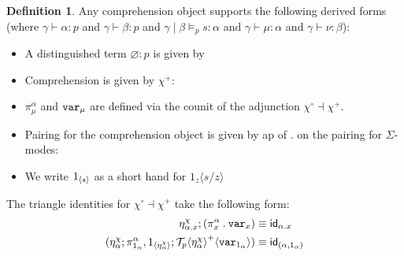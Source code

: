 \documentclass[10pt]{article}
\theoremstyle{definition}
\newtheorem{definition}{Definition}
\let\emptyset\varnothing
\newcommand\dsd[1]{\ensuremath{\mathsf{#1}}}
\newcommand{\yields}{\vdash}
\newcommand{\app}[2]{\ensuremath{#1 \: #2}}
\newcommand{\fst}[1]{\app{\dsd{fst}}{#1}}
\newcommand{\snd}[1]{\app{\dsd{snd}}{#1}}
\newcommand{\id}{\mathsf{id}}
\newcommand\TermTwoT[5]{\ensuremath{#1 \mid #3 \vDash_{#5} {#2} : #4}}
\newcommand\TrPlus[2]{\ensuremath{{#1}^+(#2)}}
\newcommand\El[2]{\mathcal{T}_{#1}(#2)}
\newcommand\ApEl[2]{\mathcal{T}_{#1}\langle#2\rangle}
\newcommand\bdot[0]{\mathbin{.}}
\newcommand\ap[2]{\ensuremath{#1 \langle #2 \rangle }}
\newcommand\ApPlus[2]{\ensuremath{{#1}^+ \langle #2 \rangle }}
\begin{document}
\begin{definition}
Any comprehension object supports the following derived forms (where $\gamma \yields \alpha : p$
and $\gamma \yields \beta : p$ and
$\TermTwoT{\gamma}{s}{\beta}{\alpha}{p}$ and $\gamma \yields \mu :
\alpha$ and $\gamma \yields \nu : \beta$):
  \begin{itemize}
  \item A distinguished term $\emptyset : p$ is given by
  \item Comprehension is given by $\chi^+$:
  \item $\pi^\alpha_\mu$ and $\mathtt{var}_{\mu}$ are defined via the counit of the adjunction $\chi^\circ \dashv \chi^+$.
  \item Pairing for the comprehension object is given by ap of
  $.$ on the pairing for $\Sigma$-modes:
  \item We write $1_{\langle {s} \rangle }$ as a short hand for $\ap{1_z}{s/z}$
  \end{itemize}
\end{definition}

The triangle identities for $\chi^\circ \dashv \chi^+$ take the following form:
\begin{align}
\eta^\chi_{\alpha.x};(\pi_x^\alpha \bdot \var{x}) &\equiv \id_{\alpha.x} \\
(\eta^\chi_\alpha ; \pi^\alpha_{1_\alpha}, \ApOne{\eta^\chi_\alpha} ; \ApPlus{\ApEl{p}{\eta^\chi_\alpha}}{\var{1_\alpha}}) &\equiv \id_{(\alpha, 1_\alpha)}
\end{align}
\end{document}
